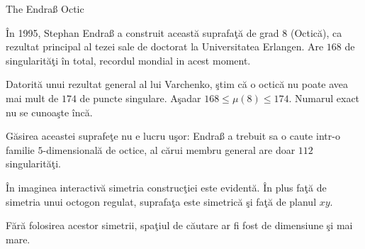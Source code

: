 \begin{surferPage}{The Endraß Octic}

    \^{I}n 1995, Stephan Endra\ss{} a construit aceast\u{a} suprafa\c{t}\u{a} de grad $8$ (Octic\u{a}),
    ca rezultat principal al tezei sale de doctorat la Universitatea Erlangen. Are $168$ de
    singularit\u{a}\c{t}i \^{i}n total, recordul mondial in acest moment.

   Datorit\u{a} unui rezultat general al lui Varchenko, \c{s}tim c\u{a} o octic\u{a} nu poate avea mai mult
   de $174$ de puncte singulare. A\c{s}adar $168 \le \mu(8) \le 174$. Numarul exact nu se cunoa\c{s}te \^{i}nc\u{a}.

    G\u{a}sirea aceastei suprafe\c{t}e nu e lucru u\c{s}or: Endra\ss{} a trebuit sa o caute intr-o familie
    $5$-dimensional\u{a} de octice, al c\u{a}rui membru general are doar $112$ singularit\u{a}\c{t}i.


    \^{I}n imaginea interactiv\u{a} simetria construc\c{t}iei este evident\u{a}.
    \^{I}n plus fa\c{t}\u{a} de simetria unui octogon regulat, suprafa\c{t}a este simetric\u{a}
    \c{s}i fa\c{t}\u{a} de planul $xy$.

    F\u{a}r\u{a} folosirea acestor simetrii, spa\c{t}iul de c\u{a}utare ar fi fost de dimensiune \c{s}i mai mare.
\end{surferPage}
